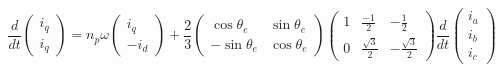 \documentclass[a4paper,10pt]{article}
\begin{document}
\begin{equation}
	\frac{d}{dt}
	\begin{pmatrix}
		i_q \\
		i_q
	\end{pmatrix} = n_p \omega \begin{pmatrix}
	i_q \\
	-i_d
\end{pmatrix} + \frac{2}{3} \begin{pmatrix}
		\cos \theta_e & \sin \theta_e \\
		-\sin \theta_e & \cos \theta_e
	\end{pmatrix} \begin{pmatrix}
		1 & \frac{-1}{2} & - \frac{1}{2} \\
		0 & \frac{\sqrt{3}}{2}& - \frac{\sqrt{3}}{2}
	\end{pmatrix}
	\frac{d}{dt}
	\begin{pmatrix}
		i_a \\
		i_b \\
		i_c
	\end{pmatrix}
	\label{eCarkeParkDiff}
\end{equation}
\end{document}
